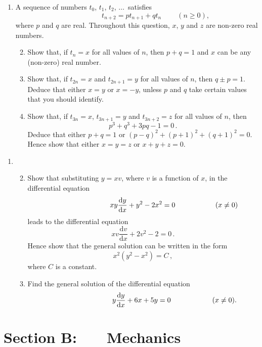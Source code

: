 \documentclass[a4, 11pt]{report}
\newlength{\qspace}
\newcounter{qnumber}
\newenvironment{question}%
 {\vspace{\qspace}
  \begin{enumerate}[\bfseries 1\quad][10]%
    \setcounter{enumi}{\value{qnumber}}%
    \item%
 }
{
  \end{enumerate}
  \filbreak
  \stepcounter{qnumber}
 }
\newenvironment{questionparts}[1][1]%
 {
  \begin{enumerate}[\bfseries (i)]%
    \setcounter{enumii}{#1}
    \addtocounter{enumii}{-1}
    \setlength{\itemsep}{5mm}
    \setlength{\parskip}{8pt}
 }
 {
  \end{enumerate}
 }
\def\d{{\mathrm d}}
\def\ge{\geqslant}
\begin{document}
\begin{question}
A sequence of numbers $t_0$, $t_1$, $t_2$, $\ldots\,$ satisfies
\[
\ \ \ \ \ \ \ \ \ \ \ \ \ \ \ \ \ \ \ \ \ \ \ \  
t_{n+2} = p t_{n+1}+qt_{n}  \ \ \ \ \ \ \ \ \ \ (n\ge0),
\]
where $p$ and $q$ are real. Throughout this question, $x$, $y$ and $z$ are non-zero real numbers.
\begin{questionparts}
\item Show that, if $t_n=x$ for all values of $n$,
then $p+q=1$ and $x$ can be any (non-zero) real number.
\item 
Show that, if $t_{2n} = x$ and $t_{2n+1}=y$ for all values of $n$,
then $q\pm p=1$. Deduce that either $x=y$ or $x=-y$, unless
$p$ and $q$ take certain values that you should identify.
\item 
Show that, if $t_{3n} = x$,  $t_{3n+1}=y$ and $t_{3n+2}=z$
for all values of $n$,
 then
\[ 
p^3+q^3 +3pq-1=0\,.
\]
 Deduce that either $p+q=1$ or 
$(p-q)^2 +(p+1)^2+(q+1)^2=0$. Hence show that either 
$x=y=z$ or $x+y+z=0$.
\end{questionparts}
\end{question}
		
\begin{question}
\begin{questionparts}
\item
Show that substituting  $y=xv$, where $v$ is a function of $x$,  in the 
 differential equation
\[ 
\hphantom{(x\ne0)\hspace*{2cm}}
xy \frac{\d y}{\d x} +y^2- 2x^2 =0
{\hspace*{2cm}(x\ne0)}
\]
leads to  the differential equation
\[
xv\frac{\d v}{\d x} +2v^2 -2=0\,.
\]
Hence show that the general solution can be written in the form 
\[
x^2(y^2 -x^2) = C 
\,,
\] where $C$ is a constant. 


\item
Find the general solution of the differential equation
\[
\hphantom{(x\ne0)\hspace*{2cm}}
 y \frac{\d y}{\d x} +6x +5y=0\, 
{\hspace*{2cm}(x\ne0)}
.
\]

\end{questionparts}
\end{question}	
		

		
	
\newpage
\section*{Section B: \ \ \ Mechanics}
\end{document}
